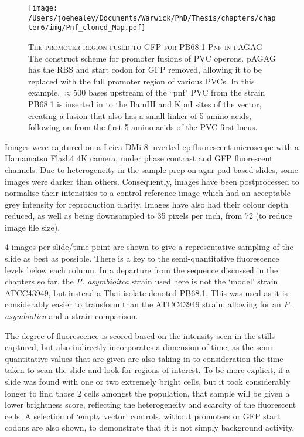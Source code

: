 \begin{figure}[h]
    \texttt{[image: /Users/joehealey/Documents/Warwick/PhD/Thesis/chapters/chapter6/img/Pnf\_cloned\_Map.pdf]}
    \captionsetup{singlelinecheck=off, justification=justified, font=footnotesize, aboveskip=10pt}
    \caption[Example of promoter fusions for PVC operons]{\textsc{\normalsize The promoter region fused to GFP for \Pasy{} PB68.1 Pnf in pAGAG} \vspace{0.1cm} \newline The construct scheme for promoter fusions of PVC operons. pAGAG has the RBS and start codon for GFP removed, allowing it to be replaced with the full promoter region of various PVCs. In this example, $\approx$500 bases upstream of the ``pnf" PVC from the \Pasy{} strain PB68.1 is inserted in to the BamHI and KpnI sites of the vector, creating a fusion that also has a small linker of 5 amino acids, following on from the first 5 amino acids of the PVC first locus.}
\label{rfahlocus}
\end{figure}




Images were captured on a Leica DMi-8 inverted epifluorescent microscope with a Hamamatsu Flash4 4K camera, under phase contrast and GFP fluorescent channels. Due to heterogeneity in the sample prep on agar pad-based slides, some images were darker than others. Consequently, images have been postprocessed to normalise their intensities to a control reference image which had an acceptable grey intensity for reproduction clarity. Images have also had their colour depth reduced, as well as being downsampled to 35 pixels per inch, from 72 (to reduce image file size).

4 images per slide/time point are shown to give a representative sampling of the slide as best as possible. There is a key to the semi-quantitative fluorescence levels below each column. In a departure from the sequence discussed in the chapters so far, the \emph{P. asymbioitca} strain used here is not the `model' strain ATCC43949, but instead a Thai isolate denoted PB68.1. This was used as it is considerably easier to transform than the ATCC43949 strain, allowing for an \emph{P. asymbiotica} and a \Plum{} strain comparison.

The degree of fluorescence is scored based on the intensity seen in the stills captured, but also indirectly incorporates a dimension of time, as the semi-quantitative values that are given are also taking in to consideration the time taken to scan the slide and look for regions of interest. To be more explicit, if a slide was found with one or two extremely bright cells, but it took considerably longer to find those 2 cells amongst the population, that sample will be given a lower brightness score, reflecting the heterogeneity and scarcity of the fluorescent cells. A selection of `empty vector' controls, without promoters or GFP start codons are also shown, to demonstrate that it is not simply background activity.

